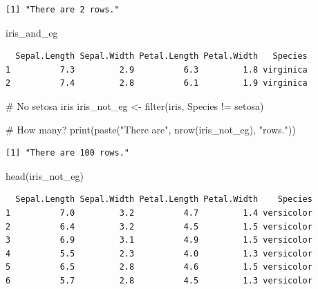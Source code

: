 \documentclass[
  letterpaper,
]{book}
\newenvironment{Shaded}{\begin{snugshade}}{\end{snugshade}}
\newcommand{\CommentTok}[1]{\textcolor[rgb]{0.37,0.37,0.37}{#1}}
\newcommand{\FunctionTok}[1]{\textcolor[rgb]{0.28,0.35,0.67}{#1}}
\newcommand{\NormalTok}[1]{\textcolor[rgb]{0.00,0.23,0.31}{#1}}
\newcommand{\OtherTok}[1]{\textcolor[rgb]{0.00,0.23,0.31}{#1}}
\newcommand{\SpecialCharTok}[1]{\textcolor[rgb]{0.37,0.37,0.37}{#1}}
\newcommand{\StringTok}[1]{\textcolor[rgb]{0.13,0.47,0.30}{#1}}
\begin{document}
\begin{verbatim}
[1] "There are 2 rows."
\end{verbatim}

\begin{Shaded}
\begin{Highlighting}[]
\NormalTok{iris\_and\_eg}
\end{Highlighting}
\end{Shaded}

\begin{verbatim}
  Sepal.Length Sepal.Width Petal.Length Petal.Width   Species
1          7.3         2.9          6.3         1.8 virginica
2          7.4         2.8          6.1         1.9 virginica
\end{verbatim}

\begin{Shaded}
\begin{Highlighting}[]
\CommentTok{\# No setosa iris}
\NormalTok{iris\_not\_eg }\OtherTok{\textless{}{-}} \FunctionTok{filter}\NormalTok{(iris, Species }\SpecialCharTok{!=} \StringTok{\textquotesingle{}setosa\textquotesingle{}}\NormalTok{)}

\CommentTok{\# How many?}
\FunctionTok{print}\NormalTok{(}\FunctionTok{paste}\NormalTok{(}\StringTok{"There are"}\NormalTok{, }\FunctionTok{nrow}\NormalTok{(iris\_not\_eg), }\StringTok{"rows."}\NormalTok{))}
\end{Highlighting}
\end{Shaded}

\begin{verbatim}
[1] "There are 100 rows."
\end{verbatim}

\begin{Shaded}
\begin{Highlighting}[]
\FunctionTok{head}\NormalTok{(iris\_not\_eg)}
\end{Highlighting}
\end{Shaded}

\begin{verbatim}
  Sepal.Length Sepal.Width Petal.Length Petal.Width    Species
1          7.0         3.2          4.7         1.4 versicolor
2          6.4         3.2          4.5         1.5 versicolor
3          6.9         3.1          4.9         1.5 versicolor
4          5.5         2.3          4.0         1.3 versicolor
5          6.5         2.8          4.6         1.5 versicolor
6          5.7         2.8          4.5         1.3 versicolor
\end{verbatim}
\end{document}
